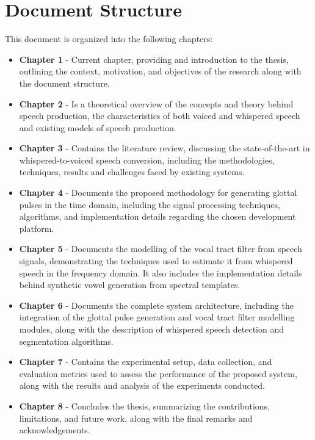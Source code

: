 \section{Document Structure}

This document is organized into the following chapters:

\begin{itemize}
    \item \textbf{Chapter 1} - Current chapter, providing and introduction to the thesis, outlining the context, motivation, and objectives of the research along with the document structure.
    \item \textbf{Chapter 2} - Is a theoretical overview of the concepts and theory behind speech production, the characteristics of both voiced and whispered speech and existing models of speech production.
    \item \textbf{Chapter 3} - Contains the literature review, discussing the state-of-the-art in whispered-to-voiced speech conversion, including the methodologies, techniques, results and challenges faced by existing systems.
    \item \textbf{Chapter 4} - Documents the proposed methodology for generating glottal pulses in the time domain, including the signal processing techniques, algorithms, and implementation details regarding the chosen development platform.
    \item \textbf{Chapter 5} - Documents the modelling of the vocal tract filter from speech signals, demonstrating the techniques used to estimate it from whispered speech in the frequency domain. It also includes the implementation details behind synthetic vowel generation from spectral templates.
    \item \textbf{Chapter 6} - Documents the complete system architecture, including the integration of the glottal pulse generation and vocal tract filter modelling modules, along with the description of whispered speech detection and segmentation algorithms.
    \item \textbf{Chapter 7} - Contains the experimental setup, data collection, and evaluation metrics used to assess the performance of the proposed system, along with the results and analysis of the experiments conducted.
    \item \textbf{Chapter 8} - Concludes the thesis, summarizing the contributions, limitations, and future work, along with the final remarks and acknowledgements.
\end{itemize}


